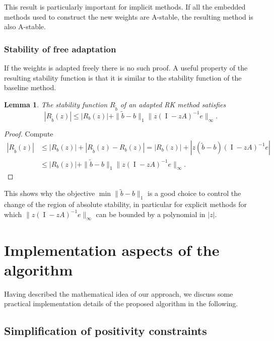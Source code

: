 \documentclass[a4paper]{article}
\numberwithin{equation}{section}
\theoremstyle{plain}
\newtheorem{lemma}[theorem]{Lemma}
\theoremstyle{definition}
\numberwithin{theorem}{section}
\newcommand{\1}{\mathbbm{1}}
\newcommand{\I}{\operatorname{I}}
\newcommand{\bt}{\tilde{b}}
\begin{document}
This result is particularly important for implicit methods.
If all the embedded methods used to construct the new weights
are A-stable, the resulting method is also A-stable.


\subsubsection{Stability of free adaptation}
If the weights is adapted freely there is no such proof.
A useful property of the resulting stability function is that it is similar to the stability function of the baseline method. 

\begin{lemma}
  The stability function $R_{\bt}$ of an adapted RK method
  satisfies
  \begin{equation}
    | R_{\bt}(z) |
    \le
    | R_{b}(z) |
    + \| \bt - b \|_1 \| z (\I - z A)^{-1} e \|_\infty.
  \end{equation}
\end{lemma}
\begin{proof}
  Compute
  \begin{equation}
  \begin{aligned}
    | R_{\bt}(z) |
    &\le
    | R_{b}(z) |
    + | R_{\bt}(z) - R_{b}(z) |
    =
    | R_{b}(z) |
    + | z (\bt - b) (\I - z A)^{-1} e|
    \\
    &\le
    | R_{b}(z) |
    + \| \bt - b \|_1 \| z (\I - z A)^{-1} e \|_\infty.
  \end{aligned}
  \end{equation}
\end{proof}
This shows why the objective $\min \| \bt - b \|_1 $ is a good
choice to control the change of the region of absolute stability,
in particular for explicit methods for which
$\| z (\I - z A)^{-1} e \|_\infty$ can be bounded by a polynomial
in $|z|$.


\section{Implementation aspects of the algorithm}\label{sec:imple}

Having described the mathematical idea of our approach,
we discuss some practical implementation details of the
proposed algorithm in the following.


\subsection{Simplification of positivity constraints}
\end{document}
